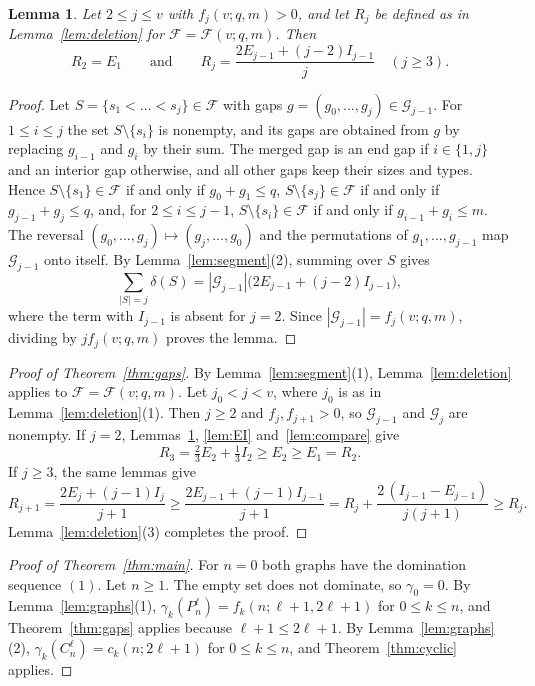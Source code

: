 \documentclass{amsart}
\newtheorem{lemma}[theorem]{Lemma}
\theoremstyle{definition}
\theoremstyle{remark}
\numberwithin{equation}{section}
\newcommand{\cF}{\mathcal{F}}
\newcommand{\cG}{\mathcal{G}}
\begin{document}
\begin{lemma}\label{lem:R}
Let $2\le j\le v$ with $f_j(v;q,m)>0$, and let $R_j$ be defined as in Lemma~\ref{lem:deletion} for $\cF=\cF(v;q,m)$. Then
\[
R_2=E_1\qquad\text{and}\qquad R_j=\frac{2E_{j-1}+(j-2)I_{j-1}}{j}\quad(j\ge3).
\]
\end{lemma}

\begin{proof}
Let $S=\{s_1<\dots<s_j\}\in\cF$ with gaps $g=(g_0,\dots,g_j)\in\cG_{j-1}$. For $1\le i\le j$ the set $S\setminus\{s_i\}$ is nonempty, and its gaps are obtained from $g$ by replacing $g_{i-1}$ and $g_i$ by their sum. The merged gap is an end gap if $i\in\{1,j\}$ and an interior gap otherwise, and all other gaps keep their sizes and types. Hence $S\setminus\{s_1\}\in\cF$ if and only if $g_0+g_1\le q$, $S\setminus\{s_j\}\in\cF$ if and only if $g_{j-1}+g_j\le q$, and, for $2\le i\le j-1$, $S\setminus\{s_i\}\in\cF$ if and only if $g_{i-1}+g_i\le m$. The reversal $(g_0,\dots,g_j)\mapsto(g_j,\dots,g_0)$ and the permutations of $g_1,\dots,g_{j-1}$ map $\cG_{j-1}$ onto itself. By Lemma~\ref{lem:segment}(2), summing over $S$ gives
\[
\sum_{|S|=j}\delta(S)=|\cG_{j-1}|\bigl(2E_{j-1}+(j-2)I_{j-1}\bigr),
\]
where the term with $I_{j-1}$ is absent for $j=2$. Since $|\cG_{j-1}|=f_j(v;q,m)$, dividing by $jf_j(v;q,m)$ proves the lemma.
\end{proof}

\begin{proof}[Proof of Theorem~\ref{thm:gaps}]
By Lemma~\ref{lem:segment}(1), Lemma~\ref{lem:deletion} applies to $\cF=\cF(v;q,m)$. Let $j_0<j<v$, where $j_0$ is as in Lemma~\ref{lem:deletion}(1). Then $j\ge2$ and $f_j,f_{j+1}>0$, so $\cG_{j-1}$ and $\cG_j$ are nonempty. If $j=2$, Lemmas~\ref{lem:R}, \ref{lem:EI} and~\ref{lem:compare} give
\[
R_3=\tfrac23E_2+\tfrac13I_2\ge E_2\ge E_1=R_2.
\]
If $j\ge3$, the same lemmas give
\[
R_{j+1}=\frac{2E_j+(j-1)I_j}{j+1}\ge\frac{2E_{j-1}+(j-1)I_{j-1}}{j+1}=R_j+\frac{2\,(I_{j-1}-E_{j-1})}{j(j+1)}\ge R_j.
\]
Lemma~\ref{lem:deletion}(3) completes the proof.
\end{proof}

\begin{proof}[Proof of Theorem~\ref{thm:main}]
For $n=0$ both graphs have the domination sequence $(1)$. Let $n\ge1$. The empty set does not dominate, so $\gamma_0=0$. By Lemma~\ref{lem:graphs}(1), $\gamma_k(P_n^\ell)=f_k(n;\ell+1,2\ell+1)$ for $0\le k\le n$, and Theorem~\ref{thm:gaps} applies because $\ell+1\le2\ell+1$. By Lemma~\ref{lem:graphs}(2), $\gamma_k(C_n^\ell)=c_k(n;2\ell+1)$ for $0\le k\le n$, and Theorem~\ref{thm:cyclic} applies.
\end{proof}
\end{document}
